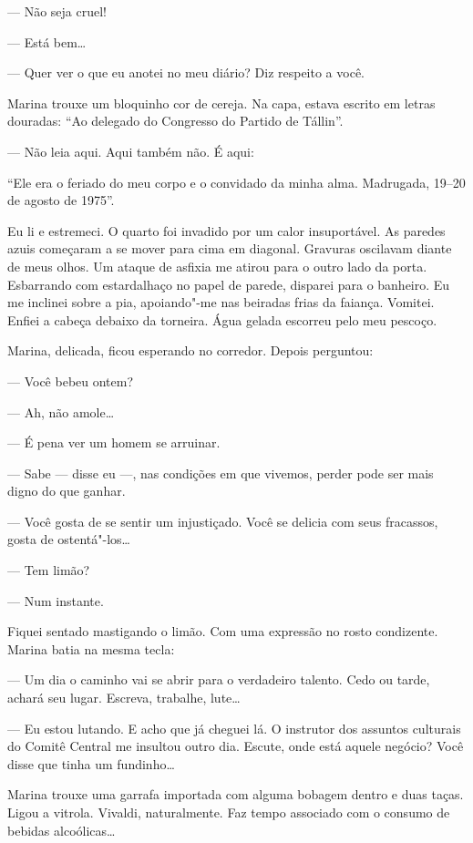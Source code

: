 --- Não seja cruel!

--- Está bem\ldots{}

--- Quer ver o que eu anotei no meu diário? Diz respeito a você.

Marina trouxe um bloquinho cor de cereja. Na capa, estava escrito em
letras douradas: ``Ao delegado do Congresso do Partido de Tállin''.

--- Não leia aqui. Aqui também não. É aqui:

``Ele era o feriado do meu corpo e o convidado da minha alma. Madrugada,
19--20 de agosto de 1975''.

Eu li e estremeci. O quarto foi invadido por um calor insuportável. As
paredes azuis começaram a se mover para cima em diagonal. Gravuras
oscilavam diante de meus olhos. Um ataque de asfixia me atirou para o
outro lado da porta. Esbarrando com estardalhaço no papel de parede,
disparei para o banheiro. Eu me inclinei sobre a pia, apoiando"-me nas
beiradas frias da faiança. Vomitei. Enfiei a cabeça debaixo da torneira.
Água gelada escorreu pelo meu pescoço.

Marina, delicada, ficou esperando no corredor. Depois perguntou:

--- Você bebeu ontem?

--- Ah, não amole\ldots{}

--- É pena ver um homem se arruinar.

--- Sabe --- disse eu ---, nas condições em que vivemos, perder pode ser
mais digno do que ganhar.

--- Você gosta de se sentir um injustiçado. Você se delicia com seus
fracassos, gosta de ostentá"-los\ldots{}

--- Tem limão?

--- Num instante.

Fiquei sentado mastigando o limão. Com uma expressão no rosto
condizente. Marina batia na mesma tecla:

--- Um dia o caminho vai se abrir para o verdadeiro talento. Cedo ou
tarde, achará seu lugar. Escreva, trabalhe, lute\ldots{}

--- Eu estou lutando. E acho que já cheguei lá. O instrutor dos assuntos
culturais do Comitê Central me insultou outro dia. Escute, onde está
aquele negócio? Você disse que tinha um fundinho\ldots{}

Marina trouxe uma garrafa importada com alguma bobagem dentro e duas
taças. Ligou a vitrola. Vivaldi, naturalmente. Faz tempo associado com o
consumo de bebidas alcoólicas\ldots{}

